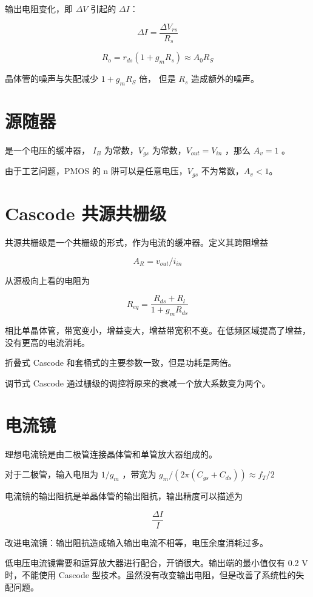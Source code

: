 \documentclass[cn,11pt,chinese,black,simple]{../elegantbook}
\begin{document}

输出电阻变化，即 \(\Delta V\) 引起的 \(\Delta I\)：

\[\Delta I = \frac{\Delta V_{rs}}{R_s}\]

\[R_o = r_{ds} (1 + g_m R_s) \approx A_0 R_S\] 

晶体管的噪声与失配减少 \(1 + g_m R_S\) 倍， 但是 \(R_s\) 造成额外的噪声。

\section{源随器}

是一个电压的缓冲器， \(I_B\) 为常数，\(V_{gs}\) 为常数，\(V_{out} = V_{in} \) ，那么 \(A_v = 1\) 。

由于工艺问题，PMOS 的 n 阱可以是任意电压，\(V_{gs}\) 不为常数，\(A_v < 1\)。

\section{Cascode 共源共栅级}

共源共栅级是一个共栅级的形式，作为电流的缓冲器。定义其跨阻增益

\[A_R = v_{out} / i_{in}\]

从源极向上看的电阻为 

\[R_{eq} = \frac{R_{ds} + R_l}{1 + g_m R_{ds}}\]

相比单晶体管，带宽变小，增益变大，增益带宽积不变。在低频区域提高了增益，没有更高的电流消耗。

折叠式 Cascode 和套桶式的主要参数一致，但是功耗是两倍。

调节式 Cascode 通过栅级的调控将原来的衰减一个放大系数变为两个。

\section{电流镜}

理想电流镜是由二极管连接晶体管和单管放大器组成的。

对于二极管，输入电阻为 \(1/g_m\) ，带宽为 \(g_m / (2 \pi (C_{gs} + C_{ds})) \approx f_T / 2\)

电流镜的输出阻抗是单晶体管的输出阻抗，输出精度可以描述为 

\[\frac{\Delta I}{I}\]

改进电流镜：输出阻抗造成输入输出电流不相等，电压余度消耗过多。

低电压电流镜需要和运算放大器进行配合，开销很大。输出端的最小值仅有 0.2 V 时，不能使用 Cascode 型技术。虽然没有改变输出电阻，但是改善了系统性的失配问题。
\end{document}
